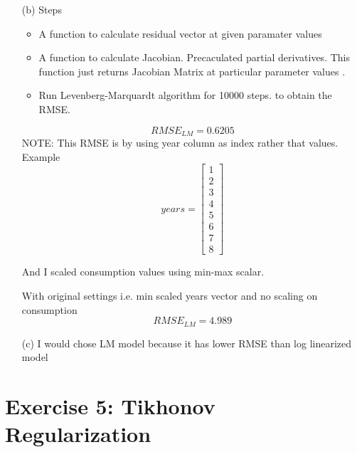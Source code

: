 \documentclass[unicode,11pt,a4paper,oneside,numbers=endperiod,openany]{scrartcl}
\begin{document}
\begin{itemize}
	
	\item [(b)] {Steps} \\
	    \begin{itemize}
          \item A function to calculate residual vector at given paramater values
          \item A function to calculate Jacobian. Precaculated partial derivatives. This function just returns Jacobian Matrix at particular parameter values .
          \item Run Levenberg-Marquardt algorithm for 10000 steps. to obtain the RMSE.
        \end{itemize}
		\begin{equation}
	        RMSE_{LM} = 0.6205
	   \end{equation}
	   NOTE: This RMSE is by using year column as index rather that values. Example
	   	\[ years = 
        	\begin{bmatrix}
        	1  \\
        	2  \\
        	3  \\
        	4  \\
        	5  \\
        	6  \\
        	7  \\
        	8
        	\end{bmatrix}
    	\]
    	
    	And I scaled consumption values using min-max scalar.
    	
    	{With original settings i.e. min scaled years vector and no scaling on consumption}
    	\begin{equation}
	        RMSE_{LM} = 4.989
	   \end{equation}
	\item [(c)]
	I would chose LM model because it has lower RMSE than log linearized model
\end{itemize}



\section*{Exercise 5: Tikhonov Regularization}
\end{document}
